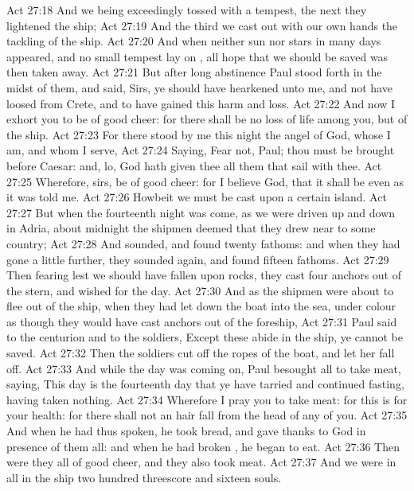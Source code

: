 \vs Act 27:18 And we being exceedingly tossed with a tempest, the next  they lightened the ship;
\vs Act 27:19 And the third  we cast out with our own hands the tackling of the ship.
\vs Act 27:20 And when neither sun nor stars in many days appeared, and no small tempest lay on , all hope that we should be saved was then taken away.
\vs Act 27:21 But after long abstinence Paul stood forth in the midst of them, and said, Sirs, ye should have hearkened unto me, and not have loosed from Crete, and to have gained this harm and loss.
\vs Act 27:22 And now I exhort you to be of good cheer: for there shall be no loss of  life among you, but of the ship.
\vs Act 27:23 For there stood by me this night the angel of God, whose I am, and whom I serve,
\vs Act 27:24 Saying, Fear not, Paul; thou must be brought before Caesar: and, lo, God hath given thee all them that sail with thee.
\vs Act 27:25 Wherefore, sirs, be of good cheer: for I believe God, that it shall be even as it was told me.
\vs Act 27:26 Howbeit we must be cast upon a certain island.
\vs Act 27:27 But when the fourteenth night was come, as we were driven up and down in Adria, about midnight the shipmen deemed that they drew near to some country;
\vs Act 27:28 And sounded, and found  twenty fathoms: and when they had gone a little further, they sounded again, and found  fifteen fathoms.
\vs Act 27:29 Then fearing lest we should have fallen upon rocks, they cast four anchors out of the stern, and wished for the day.
\vs Act 27:30 And as the shipmen were about to flee out of the ship, when they had let down the boat into the sea, under colour as though they would have cast anchors out of the foreship,
\vs Act 27:31 Paul said to the centurion and to the soldiers, Except these abide in the ship, ye cannot be saved.
\vs Act 27:32 Then the soldiers cut off the ropes of the boat, and let her fall off.
\vs Act 27:33 And while the day was coming on, Paul besought  all to take meat, saying, This day is the fourteenth day that ye have tarried and continued fasting, having taken nothing.
\vs Act 27:34 Wherefore I pray you to take  meat: for this is for your health: for there shall not an hair fall from the head of any of you.
\vs Act 27:35 And when he had thus spoken, he took bread, and gave thanks to God in presence of them all: and when he had broken , he began to eat.
\vs Act 27:36 Then were they all of good cheer, and they also took  meat.
\vs Act 27:37 And we were in all in the ship two hundred threescore and sixteen souls.
